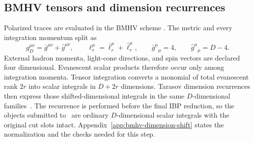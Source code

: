 \subsection{BMHV tensors and dimension recurrences}

Polarized traces are evaluated in the BMHV scheme
\cite{Breitenlohner:1977hr}.  The metric and every integration momentum split
as
\begin{equation}
 g_D^{\mu\nu}=\bar g^{\mu\nu}+\widehat g^{\mu\nu},
 \qquad
 \ell_r^\mu=\bar\ell_r^\mu+\widehat\ell_r^\mu,
 \qquad
 \bar g^\mu{}_{\mu}=4,
 \qquad
 \widehat g^\mu{}_{\mu}=D-4.
 \label{eq:bmhv-split-main}
\end{equation}
External hadron momenta, light-cone directions, and spin vectors are declared
four dimensional.  Evanescent scalar products therefore occur only among
integration momenta.  Tensor integration converts a monomial of total
evanescent rank $2r$ into scalar integrals in $D+2r$ dimensions.  Tarasov
dimension recurrences then express those shifted-dimensional integrals in the
same $D$-dimensional families~\cite{Tarasov:1996br}.  The recurrence is
performed before the final IBP reduction, so the objects submitted to
\Kira\ are ordinary $D$-dimensional scalar integrals with the original cut
slots intact.  Appendix~\ref{app:bmhv-dimension-shift} states the normalization
and the checks needed for this step.
